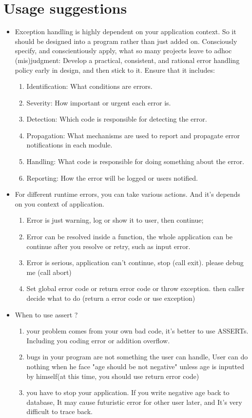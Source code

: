 \documentclass[a4paper,11pt,twoside]{book}
\begin{document}
\section{Usage suggestions}
\begin{itemize}
	\item Exception handling is highly dependent on your application context. So it should be designed into a program rather than just added on. Consciously specify, and conscientiously apply, what so many projects leave to adhoc (mis)judgment: Develop a practical, consistent, and rational error handling policy early in design, and then stick to it. Ensure that it includes:
	
	\begin{enumerate}
		\item Identification: What conditions are errors.
		\item Severity: How important or urgent each error is.
		\item Detection: Which code is responsible for detecting the error.
		\item Propagation: What mechanisms are used to report and propagate error
		notifications in each module.
		\item Handling: What code is responsible for doing something about the error.
		\item Reporting: How the error will be logged or users notified.
	\end{enumerate}
	
	
	\item For different runtime errors, you can take various actions. And it's depends on you context of application.
	
	\begin{enumerate}
		\item Error is just warning, log or show it to user, then continue;
		\item Error can be resolved inside a function, the whole application can be continue after you resolve or retry, such as input error.
		\item Error is serious, application can't continue, stop (call exit).  please debug me (call abort)
		\item Set global error code or return error code or throw exception. then caller decide what to do (return a error code or use exception)
	\end{enumerate}
	
	
	\item When to use assert ?
	\begin{enumerate}
		\item your problem comes from your own bad code, it's better to use ASSERTs.  Including you coding error or addition overflow.
		\item bugs in your program are not something the user can handle, User can do nothing when he face "age should be not negative" unless age is inputted by himself(at this time, you should use return error code)
		\item you have to stop your application. If you write negative age back to database, It may cause futuristic error for other user later, and It's very difficult to trace back.
	\end{enumerate}
	

\end{itemize}
\end{document}

